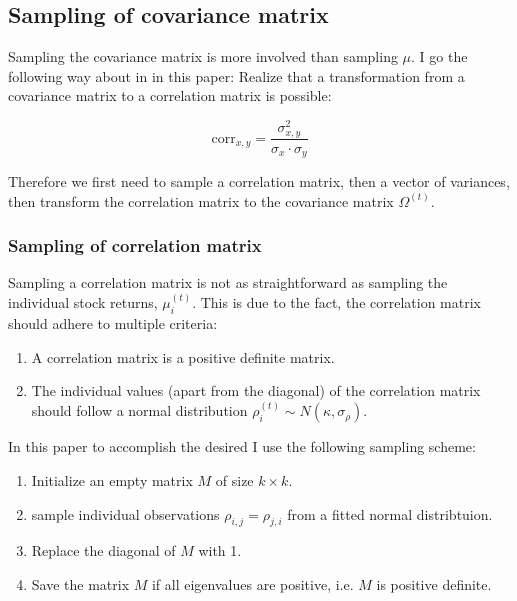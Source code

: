 \subsection{Sampling of covariance matrix}

Sampling the covariance matrix is more involved than sampling $\mu$. I go the following way about in in this paper: Realize that a transformation from a covariance matrix to a correlation matrix is possible:

\begin{equation}
    \text{corr}_{x, y} = \frac{\sigma_{x,y}^{2}}{\sigma_x \cdot \sigma_y}
\end{equation}

Therefore we first need to sample a correlation matrix, then a vector of variances, then transform the correlation matrix to the covariance matrix $\Omega^{(t)}$.

\subsubsection{Sampling of correlation matrix}

Sampling a correlation matrix is not as straightforward as sampling the individual stock returns, $\mu_i^{(t)}$. This is due to the fact, the correlation matrix should adhere to multiple criteria:

\begin{enumerate}
    \item A correlation matrix is a positive definite matrix.
    \item The individual values (apart from the diagonal) of the correlation matrix should follow a normal distribution $\rho_{i}^{(t)} \sim N(\kappa, \sigma_\rho)$.
\end{enumerate}

In this paper to accomplish the desired I use the following sampling scheme:

\begin{enumerate}
    \item Initialize an empty matrix $M$ of size $k \times k$.
    \item sample individual observations $\rho_{i,j}=\rho_{j,i}$ from a fitted normal distribtuion.
    \item Replace the diagonal of $M$ with 1.
    \item Save the matrix $M$ if all eigenvalues are positive, i.e. $M$ is positive definite.
\end{enumerate}

